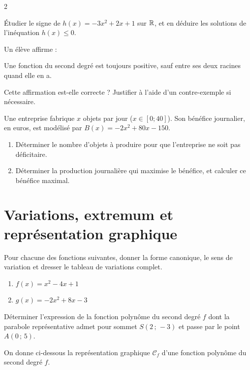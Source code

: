 \documentclass[10pt,a4paper]{article}
\begin{document}
\begin{multicols}{2}
\begin{exo}
Étudier le signe de $h(x) = -3x^2+2x+1$ sur $\mathbb{R}$, et en déduire les solutions de l'inéquation $h(x) \leqslant 0$.
\end{exo}

\begin{exo}[][appro]
Un élève affirme :
\begin{leftbar}
\og Une fonction du second degré est toujours positive, sauf entre ses deux racines quand elle en a. \fg{}
\end{leftbar}
Cette affirmation est-elle correcte ? Justifier à l'aide d'un contre-exemple si nécessaire.
\end{exo}

\begin{exo}[][bac]
Une entreprise fabrique $x$ objets par jour ($x \in [0;40]$). Son bénéfice journalier, en euros, est modélisé par $B(x) = -2x^2+80x-150$.
\begin{enumerate}[leftmargin=*]
    \item Déterminer le nombre d'objets à produire pour que l'entreprise ne soit pas déficitaire.
    \item Déterminer la production journalière qui maximise le bénéfice, et calculer ce bénéfice maximal.
\end{enumerate}
\end{exo}

\section{Variations, extremum et représentation graphique}

\begin{exo}
Pour chacune des fonctions suivantes, donner la forme canonique, le sens de variation et dresser le tableau de variations complet.
\begin{enumerate}
    \item $f(x) = x^2 - 4x + 1$
    \item $g(x) = -2x^2 + 8x - 3$
\end{enumerate}
\end{exo}

\begin{exo}[][appro]
Déterminer l'expression de la fonction polynôme du second degré $f$ dont la parabole représentative admet pour sommet $S(2\,;\,-3)$ et passe par le point $A(0\,;\,5)$.
\end{exo}

\begin{exo}
On donne ci-dessous la représentation graphique $\mathcal{C}_f$ d'une fonction polynôme du second degré $f$.


\end{exo}
\end{multicols}
\end{document}
